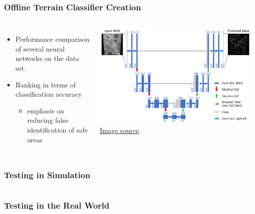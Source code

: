 \documentclass[aspectratio=169]{rubeamer}
\begin{document}
\begin{frame}
  \frametitle{Offline Terrain Classifier Creation}
  \begin{columns}
      \begin{itemize}
        \item Performance comparison of several neural networks on the data set.
        \item Ranking in terms of classification accuracy
        \begin{itemize}
          \item emphasis on reducing false identification of safe areas
        \end{itemize}
      \end{itemize}
    \centering
    \onslide
    \includegraphics[width=\textwidth]{Convolutional-neural-network-CNN-architecture-based-on-UNET-Ronneberger-et-al}\\
    \href{https://www.researchgate.net/figure/Convolutional-neural-network-CNN-architecture-based-on-UNET-Ronneberger-et-al_fig2_323597886}{Image source}
  \end{columns}
\end{frame}

\begin{frame}
  \frametitle{Testing in Simulation}
  \begin{columns}
    \centering
  \end{columns}
\end{frame}

\begin{frame}
  \frametitle{Testing in the Real World}
  \begin{columns}
    \centering
  \end{columns}
\end{frame}
\end{document}
